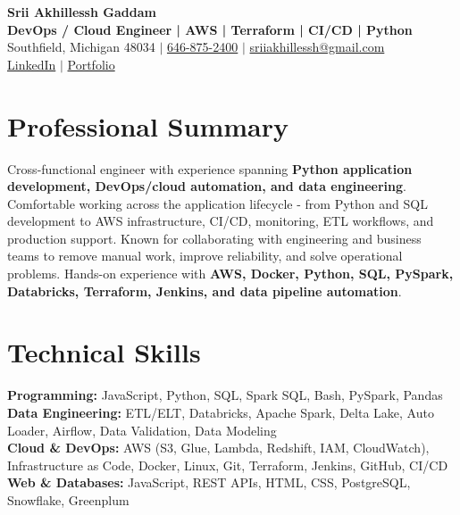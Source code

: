 \documentclass[letterpaper,10pt]{article}
\begin{document}
\fontsize{9.35pt}{10.45pt}\selectfont

\begin{center}
    {\LARGE \textbf{Srii Akhillessh Gaddam}} \\[-1pt]
    \textbf{DevOps / Cloud Engineer | AWS | Terraform | CI/CD | Python} \\[2pt]
    Southfield, Michigan 48034 $|$
    \href{tel:6468752400}{646-875-2400} $|$
    \href{mailto:sriiakhillessh@gmail.com}{sriiakhillessh@gmail.com} \\[1pt]
    \href{https://www.linkedin.com/in/srii-akhiilessh-gaddam-b48668191/}{LinkedIn} $|$
    \href{https://sriiakhillesshg.github.io/portfolio/}{Portfolio}
\end{center}
\vspace{-8pt}

\section{Professional Summary}
\small{Cross-functional engineer with experience spanning \textbf{Python application development, DevOps/cloud automation, and data engineering}. Comfortable working across the application lifecycle - from Python and SQL development to AWS infrastructure, CI/CD, monitoring, ETL workflows, and production support. Known for collaborating with engineering and business teams to remove manual work, improve reliability, and solve operational problems. Hands-on experience with \textbf{AWS, Docker, Python, SQL, PySpark, Databricks, Terraform, Jenkins, and data pipeline automation}.}

\section{Technical Skills}
\small{
\textbf{Programming:} JavaScript, Python, SQL, Spark SQL, Bash, PySpark, Pandas \\
\textbf{Data Engineering:} ETL/ELT, Databricks, Apache Spark, Delta Lake, Auto Loader, Airflow, Data Validation, Data Modeling \\
\textbf{Cloud \& DevOps:} AWS (S3, Glue, Lambda, Redshift, IAM, CloudWatch), Infrastructure as Code, Docker, Linux, Git, Terraform, Jenkins, GitHub, CI/CD \\
\textbf{Web \& Databases:} JavaScript, REST APIs, HTML, CSS, PostgreSQL, Snowflake, Greenplum
}
\end{document}
